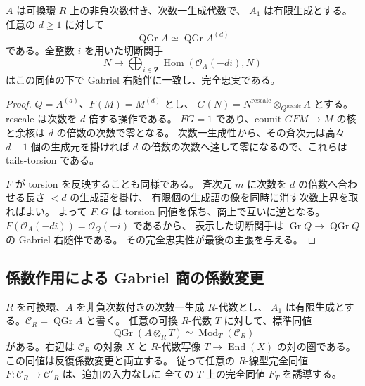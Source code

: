 \begin{lemma}
\label{lem:nfm-gabriel}
$A$ は可換環 $R$ 上の非負次数付き、次数一生成代数で、
$A_1$ は有限生成とする。任意の $d\geq1$ に対して
\[
 \operatorname{QGr}A\simeq\operatorname{QGr}A^{(d)}
\]
である。全整数 $i$ を用いた切断関手
\[
 N\longmapsto\bigoplus_{i\in\mathbf Z}
 \operatorname{Hom}(\mathcal O_A(-di),N)
\]
はこの同値の下で Gabriel 右随伴に一致し、完全忠実である。
\end{lemma}
\begin{proof}
$Q=A^{(d)}$、$F(M)=M^{(d)}$ とし、
$G(N)=N^{\mathrm{rescale}}\otimes_{Q^{\mathrm{rescale}}}A$ とする。
rescale は次数を $d$ 倍する操作である。
$FG=1$ であり、counit $GFM\to M$ の核と余核は
$d$ の倍数の次数で零となる。
次数一生成性から、その斉次元は高々 $d-1$ 個の生成元を掛ければ
$d$ の倍数の次数へ達して零になるので、これらは tails-torsion である。

$F$ が torsion を反映することも同様である。
斉次元 $m$ に次数を $d$ の倍数へ合わせる長さ $<d$ の生成語を掛け、
有限個の生成語の像を同時に消す次数上界を取ればよい。
よって $F,G$ は torsion 同値を保ち、商上で互いに逆となる。
$F(\mathcal O_A(-di))=\mathcal O_Q(-i)$ であるから、
表示した切断関手は $\operatorname{Gr}Q\to\operatorname{QGr}Q$ の Gabriel 右随伴である。
その完全忠実性が最後の主張を与える。
\end{proof}

\subsection{係数作用による Gabriel 商の係数変更}

\begin{lemma}
\label{lem:nfm-coefficient-objects}
$R$ を可換環、$A$ を非負次数付きの次数一生成 $R$-代数とし、
$A_1$ は有限生成とする。$\mathcal C_R=\operatorname{QGr}A$ と書く。
任意の可換 $R$-代数 $T$ に対して、標準同値
\[
 \operatorname{QGr}(A\otimes_RT)
 \simeq \operatorname{Mod}_T(\mathcal C_R)
\]
がある。右辺は $\mathcal C_R$ の対象 $X$ と
$R$-代数写像 $T\to\operatorname{End}(X)$ の対の圏である。
この同値は反復係数変更と両立する。
従って任意の $R$-線型完全同値
$F:\mathcal C_R\to\mathcal C'_R$ は、追加の入力なしに
全ての $T$ 上の完全同値 $F_T$ を誘導する。
\end{lemma}

